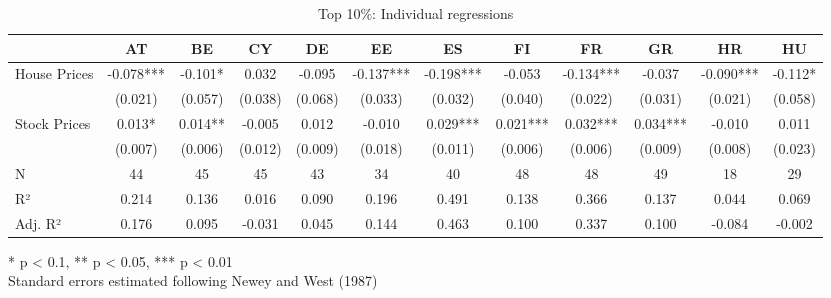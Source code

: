 \documentclass[
  a4paper,
  DIV=11,
  numbers=noendperiod]{scrartcl}
\begin{document}
\begin{landscape}

\begin{table}[h]
\caption{Top 10\%: Individual regressions} 
\fontsize{7.5pt}{9.0pt}\selectfont
\begin{tabular*}{\linewidth}{@{\extracolsep{\fill}}lccccccccccc}
\toprule
  & AT & BE & CY & DE & EE & ES & FI & FR & GR & HR & HU \\ 
\midrule\addlinespace[2.5pt]
House Prices & -0.078*** & -0.101* & 0.032 & -0.095 & -0.137*** & -0.198*** & -0.053 & -0.134*** & -0.037 & -0.090*** & -0.112* \\ 
 & (0.021) & (0.057) & (0.038) & (0.068) & (0.033) & (0.032) & (0.040) & (0.022) & (0.031) & (0.021) & (0.058) \\ 
Stock Prices & 0.013* & 0.014** & -0.005 & 0.012 & -0.010 & 0.029*** & 0.021*** & 0.032*** & 0.034*** & -0.010 & 0.011 \\ 
{} & {(0.007)} & {(0.006)} & {(0.012)} & {(0.009)} & {(0.018)} & {(0.011)} & {(0.006)} & {(0.006)} & {(0.009)} & {(0.008)} & {(0.023)} \\ 
N & 44 & 45 & 45 & 43 & 34 & 40 & 48 & 48 & 49 & 18 & 29 \\ 
R² & 0.214 & 0.136 & 0.016 & 0.090 & 0.196 & 0.491 & 0.138 & 0.366 & 0.137 & 0.044 & 0.069 \\ 
Adj. R² & 0.176 & 0.095 & -0.031 & 0.045 & 0.144 & 0.463 & 0.100 & 0.337 & 0.100 & -0.084 & -0.002 \\ 
\bottomrule
\end{tabular*}
\begin{minipage}{\linewidth}
* p < 0.1, ** p < 0.05, *** p < 0.01\\
Standard errors estimated following Newey and West (1987)\\
\end{minipage}
\end{table}





\end{landscape}
\end{document}
